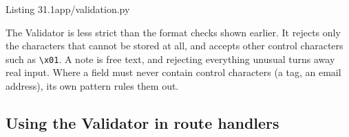 \begin{codeboxcap}{\textcolor{accent}{Listing 31.1}\enspace app/validation.py}
\begin{Shaded}
\begin{Highlighting}[]
        \NormalTok{,}
\NormalTok{,}
        \OperatorTok{*}\NormalTok{,}
 \OperatorTok{=} \NormalTok{,}
\NormalTok{        default: Optional[}\NormalTok{] }\OperatorTok{=} \NormalTok{,}
\NormalTok{    ) }\OperatorTok{{-}\textgreater{}}\NormalTok{ Optional[}\NormalTok{]:}
          \NormalTok{:}

          

         \OperatorTok{=}\OperatorTok{=}
\end{Highlighting}
\end{Shaded}

\end{codeboxcap}

\noindent{}The Validator is less strict than the format checks shown earlier. It rejects only the characters that cannot be stored at all, and accepts other control characters such as \texttt{\textbackslash{}x01}. A note is free text, and rejecting everything unusual turns away real input. Where a field must never contain control characters (a tag, an email address), its own pattern rules them out.

\subsection*{Using the Validator in route handlers}\label{31-input-handling:using-the-validator-in-route-handlers}


